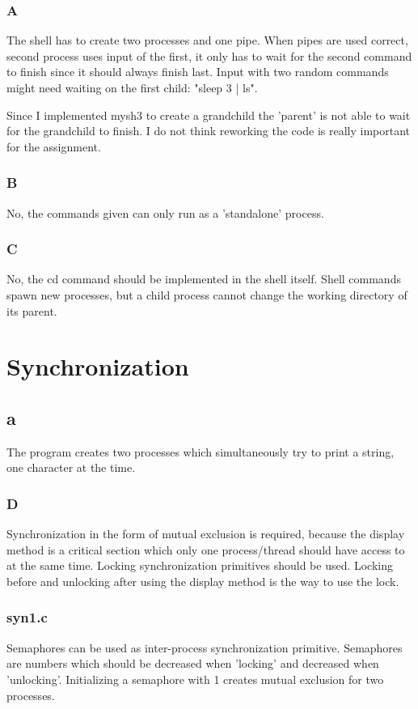 \documentclass[10pt,a4paper]{article}
\begin{document}
\subsubsection{A}
The shell has to create two processes and one pipe. When pipes are used correct, second process uses input of the first, it only has to wait for the second command to finish since it should always finish last. Input with two random commands might need waiting on the first child: "sleep 3 | ls". 

Since I implemented mysh3 to create a grandchild the 'parent' is not able to wait for the grandchild to finish. I do not think reworking the code is really important for the assignment.

\subsubsection{B}
No, the commands given can only run as a 'standalone' process.

\subsubsection{C}
No, the cd command should be implemented in the shell itself. Shell commands spawn new processes, but a child process cannot change the working directory of its parent.

\section{Synchronization}
\subsection{a}
The program creates two processes which simultaneously try to print a string, one character at the time.

\subsubsection{D}
Synchronization in the form of mutual exclusion is required, because the display method is a critical section which only one process/thread should have access to at the same time. Locking synchronization primitives should be used. Locking before and unlocking after using the display method is the way to use the lock.

\subsubsection{syn1.c}
Semaphores can be used as inter-process synchronization primitive. Semaphores are numbers which should be decreased when 'locking' and decreased when 'unlocking'. Initializing a semaphore with 1 creates mutual exclusion for two processes.
\end{document}
